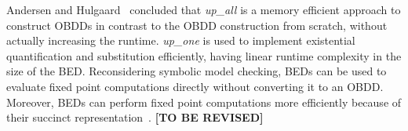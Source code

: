 \documentclass{vldb}
\newcommand{\tbr}{\textbf{[TO BE REVISED]}}
\begin{document}
Andersen and Hulgaard~\cite{ANDERSEN97} concluded that \textit{up\_all} is a
memory efficient approach to construct OBDDs in contrast to the OBDD construction
from scratch, without actually increasing the runtime. \textit{up\_one} is used
to implement existential quantification and substitution efficiently, having
linear runtime complexity in the size of the BED. Reconsidering symbolic model
checking, BEDs can be used to evaluate fixed point computations directly without
converting it to an OBDD. Moreover, BEDs can perform fixed point computations more
efficiently because of their succinct representation~\cite{ANDERSEN97}. \tbr

\clearpage



\end{document}
